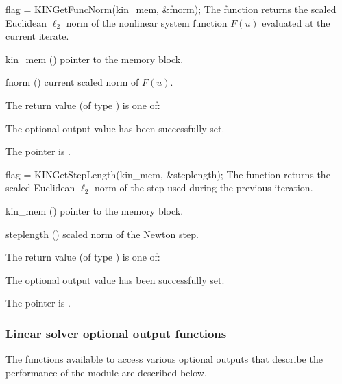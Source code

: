 {}
{
  flag = KINGetFuncNorm(kin\_mem, \&fnorm);
}
{
  The function  returns the scaled Euclidean $\ell_2$ norm of the 
  nonlinear system function $F(u)$ evaluated at the current iterate.
}
{
  \begin{args}
  \item[kin\_mem] ()
    pointer to the {\kinsol} memory block.
  \item[fnorm] ()
    current scaled norm of $F(u)$.
  \end{args}
}
{
  The return value  (of type ) is one of:
  \begin{args}
  \item[\Id{KIN\_SUCCESS}] 
    The optional output value has been successfully set.
  \item[\Id{KIN\_MEM\_NULL}]
    The  pointer is .
  \end{args}
}
{}
{
  flag = KINGetStepLength(kin\_mem, \&steplength);
}
{
  The function  returns the scaled Euclidean $\ell_2$ norm of
  the step used during the previous iteration.
}
{
  \begin{args}[steplength]
  \item[kin\_mem] ()
    pointer to the {\kinsol} memory block.
  \item[steplength] ()
    scaled norm of the Newton step.
  \end{args}
}
{
  The return value  (of type ) is one of:
  \begin{args}
  \item[\Id{KIN\_SUCCESS}] 
    The optional output value has been successfully set.
  \item[\Id{KIN\_MEM\_NULL}]
    The  pointer is .
  \end{args}
}
{}
\subsubsection{Linear solver optional output functions}\label{sss:linsolv_io}
The functions available to access various optional outputs that describe the 
performance of the {\kinspgmr} module are described below.


